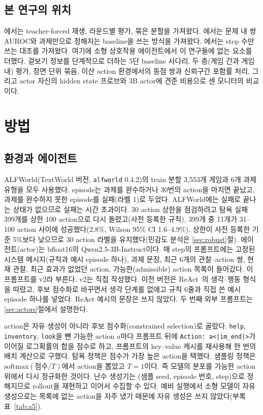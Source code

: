 \documentclass[11pt]{article}
\newcommand{\code}[1]{\texttt{#1}}
\begin{document}
\subsection{본 연구의 위치}
\cite{ruan2026doomed}에서는 teacher-forced 재생, 라운드별 평가, 묶은 분할을 가져왔다. \cite{bulut2026problem}에서는 문제 내 쌍 AUROC와 과제만으로 정해지는 baseline을 쓰는 방식을 가져왔다. \cite{wang2026failfast}에서는 step 수만 쓰는 대조를 가져왔다.
여기에 소형 상호작용 에이전트에서 이 연구들에 없는 요소를 더했다. 겉보기 정보를 단계적으로 더하는 5단 baseline 사다리, 두 층(게임 간과 게임 내) 평가, 장면 단위 묶음,
이산 action 환경에서의 동점 쌍과 신뢰구간 포함률 처리, 그리고 actor 자신의 hidden state 프로브와 3B actor에 견준 비용으로 센 모니터의 비교이다.

\section{방법}

\subsection{환경과 에이전트}
ALFWorld(TextWorld 버전, \code{alfworld} 0.4.2)의 train 분할 3,553개 게임과 6개 과제 유형을 모두 사용했다.
episode는 과제를 완수하거나 30번의 action을 마치면 끝났고, 과제를 완수하지 못한 episode를 실패(라벨 1)로 두었다.
ALFWorld에는 실패로 끝나는 상태가 없으므로 실패는 시간 초과이다. 30 action 상한을 점검하려고 탐욕 실패 399개를 상한 100 action으로 다시 돌렸고(사전 등록한 규칙),
399개 중 11개가 31--100 action 사이에 성공했다(2.8\%, Wilson 95\% CI 1.6--4.9\%). 상한이 사전 등록한 기준 5\%보다 낮으므로 30 action 라벨을 유지했다(민감도 분석은 \ref{sec:robust}절).
에이전트(actor)는 bfloat16의 Qwen2.5-3B-Instruct이다. 매 step의 프롬프트에는 고정된 시스템 메시지(규칙과 예시 episode 하나),
과제 문장, 최근 6개의 관찰--action 쌍, 현재 관찰, 최근 효과가 없었던 action, 가능한(admissible) action 목록이 들어갔다.
이 프롬프트를 v2라 부른다. v2는 직접 작성했다. 이전 버전은 ReAct~\cite{yao2023react}의 생각--행동 형식을 따랐고, 후보 점수화로 바꾸면서 생각 단계를 없애고
규칙 6줄과 직접 쓴 예시 episode 하나를 넣었다. ReAct 예시의 문장은 쓰지 않았다. 두 번째 외부 프롬프트는 \ref{sec:actors}절에서 설명한다.

action은 자유 생성이 아니라 후보 점수화(constrained selection)로 골랐다. \code{help}, \code{inventory}, \code{look}을 뺀 가능한 action $a$마다
프롬프트 뒤에 \code{Action: a<|im\_end|>}가 이어질 로그확률의 합을 점수로 하고, 프롬프트의 key--value 캐시를 재사용해 한 번의 배치 계산으로 구했다.
탐욕 정책은 점수가 가장 높은 action을 택했다. 샘플링 정책은 $\mathrm{softmax}(\text{점수}/T)$에서 action을 뽑았고 $T=1$이다.
즉 모델의 분포를 가능한 action 위에서 다시 정규화한 것이다. 난수 생성기는 (샘플 seed, episode 번호, step)으로 정해지므로 rollout을 재현하고 이어서 수집할 수 있다.
예비 실행에서 소형 모델이 자유 생성으로는 목록에 없는 action을 자주 냈기 때문에 자유 생성은 쓰지 않았다(부록 표~\ref{tab:a5}).
\end{document}
